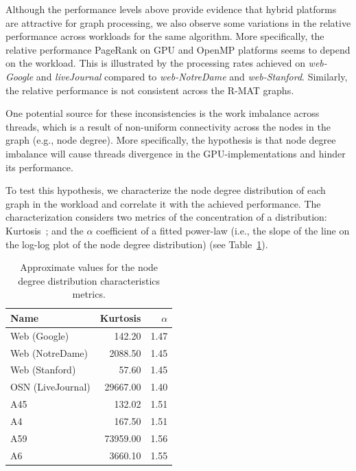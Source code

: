 Although the performance levels above provide evidence that hybrid platforms are attractive for graph processing, we also observe some variations in the relative performance across workloads for the same algorithm. More specifically, the relative performance PageRank on GPU and OpenMP platforms seems to depend on the workload. This is illustrated by the processing rates achieved on {\em web-Google} and {\em liveJournal} compared to {\em web-NotreDame} and {\em web-Stanford}. Similarly, the relative performance is not consistent across the R-MAT graphs. 

One potential source for these inconsistencies is the work imbalance across threads, which is a result of non-uniform connectivity across the nodes in the graph (e.g., node degree). More specifically, the hypothesis is that node degree imbalance will cause threads divergence in the GPU-implementations and hinder its performance. 

To test this hypothesis, we characterize the node degree distribution of each graph in the workload and correlate it with the achieved performance. The characterization considers two metrics of the concentration of a distribution: Kurtosis~\cite{refstats}; and the $\alpha$ coefficient of a fitted power-law (i.e., the slope of the line on the log-log plot of the node degree distribution) (see Table~\ref{tab:kurtosis}). 

\begin{table}[ht]
\centering
\begin{tabular}{l|r|r}
Name              & Kurtosis   & $\alpha$ \\\hline
Web (Google)      & 142.20   & 1.47    \\\hline
Web (NotreDame)   & 2088.50  & 1.45    \\\hline
Web (Stanford)    & 57.60    & 1.45    \\\hline
OSN (LiveJournal) & 29667.00 & 1.40    \\\hline
A45               & 132.02  & 1.51    \\\hline
A4                & 167.50   & 1.51    \\\hline
A59               & 73959.00 & 1.56    \\\hline
A6                & 3660.10  & 1.55     \\\hline
\end{tabular}
\caption{Approximate values for the node degree distribution characteristics metrics.}
\label{tab:kurtosis}
\end{table}
            

